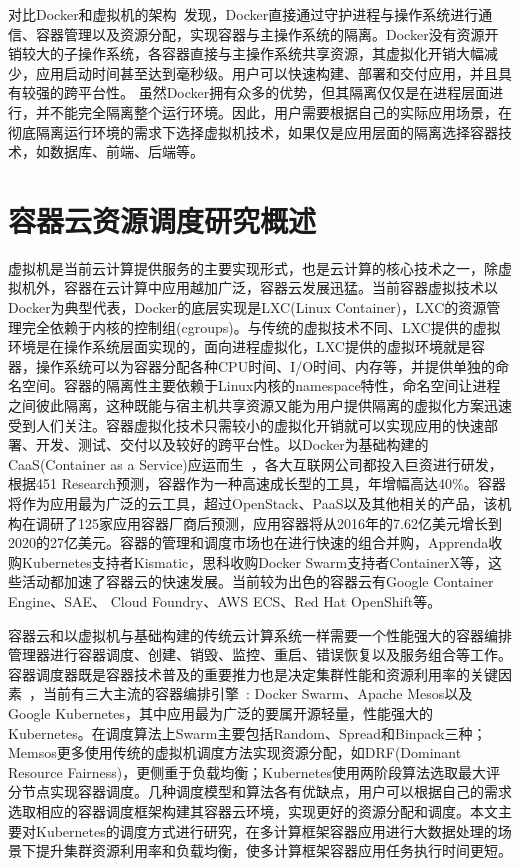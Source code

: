 对比Docker和虚拟机的架构~\cite{Barik2017Performance, Felter2007An}发现，Docker直接通过守护进程与操作系统进行通信、容器管理以及资源分配，实现容器与主操作系统的隔离。Docker没有资源开销较大的子操作系统，各容器直接与主操作系统共享资源，其虚拟化开销大幅减少，应用启动时间甚至达到毫秒级。用户可以快速构建、部署和交付应用，并且具有较强的跨平台性。
虽然Docker拥有众多的优势，但其隔离仅仅是在进程层面进行，并不能完全隔离整个运行环境。因此，用户需要根据自己的实际应用场景，在彻底隔离运行环境的需求下选择虚拟机技术，如果仅是应用层面的隔离选择容器技术，如数据库、前端、后端等。

\section{容器云资源调度研究概述}
虚拟机是当前云计算提供服务的主要实现形式，也是云计算的核心技术之一，除虚拟机外，容器在云计算中应用越加广泛，容器云发展迅猛。当前容器虚拟技术以Docker为典型代表，Docker的底层实现是LXC(Linux Container)，LXC的资源管理完全依赖于内核的控制组(cgroups)。与传统的虚拟技术不同、LXC提供的虚拟环境是在操作系统层面实现的，面向进程虚拟化，LXC提供的虚拟环境就是容器，操作系统可以为容器分配各种CPU时间、I/O时间、内存等，并提供单独的命名空间。容器的隔离性主要依赖于Linux内核的namespace特性，命名空间让进程之间彼此隔离，这种既能与宿主机共享资源又能为用户提供隔离的虚拟化方案迅速受到人们关注。容器虚拟化技术只需较小的虚拟化开销就可以实现应用的快速部署、开发、测试、交付以及较好的跨平台性。以Docker为基础构建的CaaS(Container as a Service)应运而生~\cite{Kozhirbayev2017A}，各大互联网公司都投入巨资进行研发，根据451 Research预测，容器作为一种高速成长型的工具，年增幅高达40\%。容器将作为应用最为广泛的云工具，超过OpenStack、PaaS以及其他相关的产品，该机构在调研了125家应用容器厂商后预测，应用容器将从2016年的7.62亿美元增长到2020的27亿美元。容器的管理和调度市场也在进行快速的组合并购，Apprenda收购Kubernetes支持者Kismatic，思科收购Docker Swarm支持者ContainerX等，这些活动都加速了容器云的快速发展。当前较为出色的容器云有Google Container Engine、SAE、 Cloud Foundry、AWS ECS、Red Hat OpenShift等。

容器云和以虚拟机与基础构建的传统云计算系统一样需要一个性能强大的容器编排管理器进行容器调度、创建、销毁、监控、重启、错误恢复以及服务组合等工作。容器调度器既是容器技术普及的重要推力也是决定集群性能和资源利用率的关键因素~\cite{Application2017}，当前有三大主流的容器编排引擎~\cite{Usman2016}: Docker Swarm、Apache Mesos以及Google Kubernetes，其中应用最为广泛的要属开源轻量，性能强大的Kubernetes。在调度算法上Swarm主要包括Random、Spread和Binpack三种；Memsos更多使用传统的虚拟机调度方法实现资源分配，如DRF(Dominant Resource Fairness)，更侧重于负载均衡；Kubernetes使用两阶段算法选取最大评分节点实现容器调度。几种调度模型和算法各有优缺点，用户可以根据自己的需求选取相应的容器调度框架构建其容器云环境，实现更好的资源分配和调度。本文主要对Kubernetes的调度方式进行研究，在多计算框架容器应用进行大数据处理的场景下提升集群资源利用率和负载均衡，使多计算框架容器应用任务执行时间更短。


